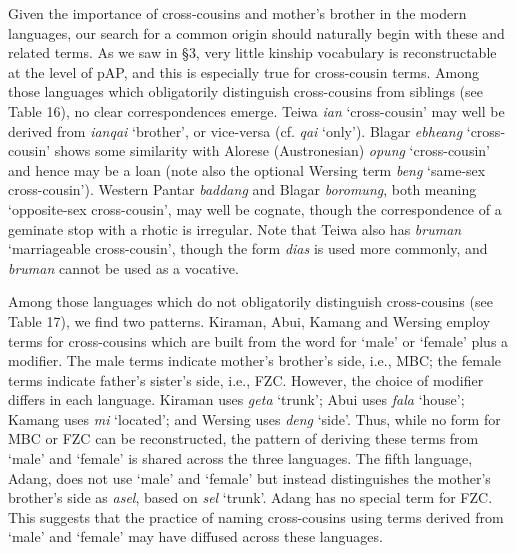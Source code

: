 Given the importance of cross-cousins and mother's brother in the modern languages, our search for a common origin should naturally begin with these and related terms. As we saw in {\S}3, very little kinship vocabulary is reconstructable at the level of pAP, and this is especially true for cross-cousin terms. Among those languages which obligatorily distinguish cross-cousins from siblings (see Table 16), no clear correspondences emerge. Teiwa \textit{ian} `cross-cousin' may well be derived from \textit{ianqai} `brother', or vice-versa (cf. \textit{qai} `only'). Blagar \textit{ebheang} `cross-cousin' shows some similarity with Alorese (Austronesian) \textit{opung} `cross-cousin' and hence may be a loan (note also the optional Wersing term \textit{beng} `same-sex cross-cousin'). Western Pantar \textit{baddang} and Blagar \textit{boromung}, both meaning `opposite-sex cross-cousin', may well be cognate, though the correspondence of a geminate stop with a rhotic is irregular. Note that Teiwa also has \textit{bruman} `marriageable cross-cousin', though the form \textit{dias} is used more commonly, and \textit{bruman} cannot be used as a vocative.

Among those languages which do not obligatorily distinguish cross-cousins (see Table 17), we find two patterns. Kiraman, Abui, Kamang and Wersing employ terms for cross-cousins which are built from the word for `male' or `female' plus a modifier. The male terms indicate mother's brother's side, i.e., MBC; the female terms indicate father's sister's side, i.e., FZC. However, the choice of modifier differs in each language. Kiraman uses \textit{geta} `trunk'; Abui uses \textit{fala} `house'; Kamang uses \textit{mi} `located'; and Wersing uses \textit{deng} `side'. Thus, while no form for MBC or FZC can be reconstructed, the pattern of deriving these terms from `male' and `female' is shared across the three languages. The fifth language, Adang, does not use `male' and `female' but instead distinguishes the mother's brother's side as \textit{asel}, based on \textit{sel} `trunk'. Adang has no special term for FZC. This suggests that the practice of naming cross-cousins using terms derived from `male' and `female' may have diffused across these languages.

